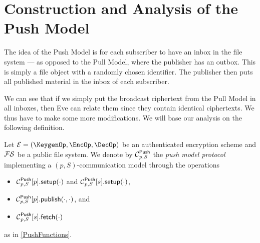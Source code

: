 \section{Construction and Analysis of the Push Model}
\label{PushAnalysis}

The idea of the Push Model is for each subscriber to have an inbox in the file 
system --- as opposed to the Pull Model, where the publisher has an outbox.
This is simply a file object with a randomly chosen identifier.
The publisher then puts all published material in the inbox of each subscriber.

We can see that if we simply put the broadcast ciphertext from the Pull Model 
in all inboxes, then Eve can relate them since they contain identical 
ciphertexts.
We thus have to make some more modifications.
We will base our analysis on the following definition.

\begin{definition}\label{PushModel}
  Let \(\mathcal{E} = (\KeygenOp, \EncOp, \DecOp)\) be an authenticated 
  encryption scheme and \(\operatorname{\mathcal{FS}}\) be a public file system.
  We denote by \(\Push[p, S]\) the \emph{push model protocol} implementing 
  a \((p, S)\)-communication model through the operations
  \begin{itemize}
    \item \(\pnsetup[p, S]{p}[\cdot]\) and \(\pnsetup[p, S]{s}[\cdot]\),
    \item \(\pnpub[p, S]{p}[\cdot][\cdot]\), and
    \item \(\pnget[p, S]{s}[\cdot]\)
  \end{itemize}
  as in \cref{PushFunctions}.
\end{definition}

